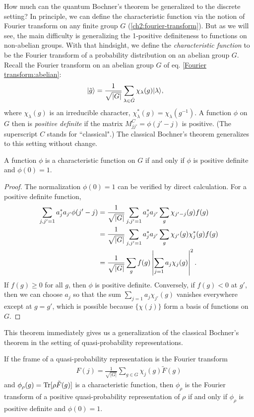 How much can the quantum Bochner's theorem be generalized to the discrete setting? In principle, we can define the characteristic function via the notion of Fourier transform on any finite group $G$ (\autoref{ch2:fourier-transform}). But as we will see, the main difficulty is generalizing the 1-positive definiteness to functions on non-abelian groups. With that hindsight, we define the \emph{characteristic function} to be the Fourier transform of a probability distribution on an abelian group $G$. Recall the Fourier transform on an abelian group $G$ of eq. \eqref{Fourier transform:abelian}:
\begin{align}
{\left\vert{\tilde{g}}\right\rangle} &= \frac{1}{\sqrt{|G|}} \sum_{\lambda \in \hat{G}} \chi_{\lambda}(g) {\left\vert{\lambda}\right\rangle},
\end{align}
where $\chi_{\lambda}(g)$ is an irreducible character, $\chi_{\lambda}^*(g) = \chi_{\lambda}(g^{-1})$.
A function $\phi$ on $G$ then is \emph{positive definite} if the matrix $M^C_{jj'} = \phi(j'-j)$ is positive. (The superscript $C$ stands for ``classical".) The classical Bochner's theorem generalizes to this setting without change.
\begin{theorem} \label{thm:general-bochner}
	A function $\phi$ is a characteristic function on $G$ if and only if $\phi$ is positive definite and $\phi(0)=1$.
\end{theorem}
\begin{proof}
	The normalization $\phi(0)=1$ can be verified by direct calculation. For a positive definite function,
	\begin{align*}
	\sum_{j,j'=1}a^*_{j}a_{j'}\phi(j'-j)
	&= \frac{1}{\sqrt{|G|}}\sum_{j,j'=1}a^*_{j}a_{j'}\sum_{g}\chi_{j'-j}(g)f(g)\\
	&= \frac{1}{\sqrt{|G|}}\sum_{j,j'=1}a^*_{j}a_{j'}\sum_{g}\chi_{j'}(g) \chi^*_{j}(g) f(g)\\
	&= \frac{1}{\sqrt{|G|}}\sum_{g}f(g)\left|\sum_{j=1}a_{j}\chi_{j}(g)\right|^{2}.
	\end{align*}
	If $f(g) \ge 0$ for all $g$, then $\phi$ is positive definite. Conversely,
	if $f(g)<0$ at $g'$, then we can choose $a_{j}$ so that the sum $\sum_{j=1}a_{j}\chi_{j'}(g)$
	vanishes everywhere except at $g=g'$, which is possible because $\{ \chi(j) \} $
	form a basis of functions on $G$.
\end{proof}
\noindent This theorem immediately gives us a generalization of the classical Bochner's theorem in the setting of quasi-probability representations.
\begin{theorem}\label{thm:classical-bochner-quasi-rep}
	If the frame of a quasi-probability representation is the Fourier transform
	\begin{align}
	F(j) =\frac{1}{\sqrt{|G|}}\sum_{g \in G} \chi_j(g) \tilde F(g) \label{fourier-frame}
	\end{align}
	and $\phi_{\rho}(g) = \mathrm{Tr}[\rho \tilde F(g)]$ is a characteristic function, then $\phi_{\rho}$
	is the Fourier transform of a positive quasi-probability representation
	of $\rho$ if and only if $\phi_{\rho}$ is positive definite and $\phi(0)=1$.
\end{theorem}

